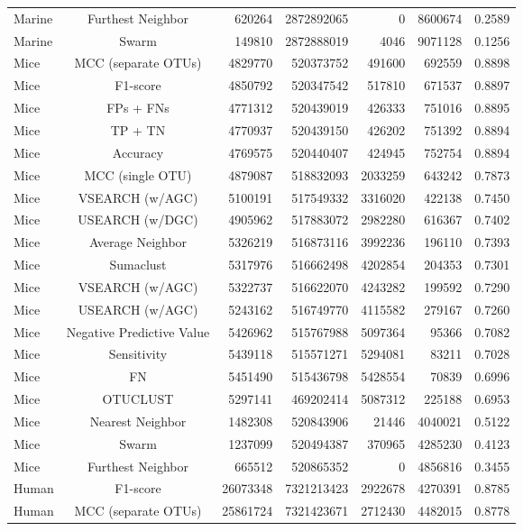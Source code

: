 \documentclass[]{article}
\begin{document}
\begin{table}[!ht]
\begin{tabular}{lcrrrrc}
  Marine & Furthest Neighbor & 620264 & 2872892065 & 0 & 8600674 & 0.2589 \\ 
  Marine & Swarm & 149810 & 2872888019 & 4046 & 9071128 & 0.1256 \\ 
  Mice & MCC (separate OTUs) & 4829770 & 520373752 & 491600 & 692559 & 0.8898 \\ 
  Mice & F1-score & 4850792 & 520347542 & 517810 & 671537 & 0.8897 \\ 
  Mice & FPs + FNs & 4771312 & 520439019 & 426333 & 751016 & 0.8895 \\ 
  Mice & TP + TN & 4770937 & 520439150 & 426202 & 751392 & 0.8894 \\ 
  Mice & Accuracy & 4769575 & 520440407 & 424945 & 752754 & 0.8894 \\ 
  Mice & MCC (single OTU) & 4879087 & 518832093 & 2033259 & 643242 & 0.7873 \\ 
  Mice & VSEARCH (w/AGC) & 5100191 & 517549332 & 3316020 & 422138 & 0.7450 \\ 
  Mice & USEARCH (w/DGC) & 4905962 & 517883072 & 2982280 & 616367 & 0.7402 \\ 
  Mice & Average Neighbor & 5326219 & 516873116 & 3992236 & 196110 & 0.7393 \\ 
  Mice & Sumaclust & 5317976 & 516662498 & 4202854 & 204353 & 0.7301 \\ 
  Mice & VSEARCH (w/AGC) & 5322737 & 516622070 & 4243282 & 199592 & 0.7290 \\ 
  Mice & USEARCH (w/AGC) & 5243162 & 516749770 & 4115582 & 279167 & 0.7260 \\ 
  Mice & Negative Predictive Value & 5426962 & 515767988 & 5097364 & 95366 & 0.7082 \\ 
  Mice & Sensitivity & 5439118 & 515571271 & 5294081 & 83211 & 0.7028 \\ 
  Mice & FN & 5451490 & 515436798 & 5428554 & 70839 & 0.6996 \\ 
  Mice & OTUCLUST & 5297141 & 469202414 & 5087312 & 225188 & 0.6953 \\ 
  Mice & Nearest Neighbor & 1482308 & 520843906 & 21446 & 4040021 & 0.5122 \\ 
  Mice & Swarm & 1237099 & 520494387 & 370965 & 4285230 & 0.4123 \\ 
  Mice & Furthest Neighbor & 665512 & 520865352 & 0 & 4856816 & 0.3455 \\ 
  Human & F1-score & 26073348 & 7321213423 & 2922678 & 4270391 & 0.8785 \\ 
  Human & MCC (separate OTUs) & 25861724 & 7321423671 & 2712430 & 4482015 & 0.8778 \\ 

\end{tabular}
\end{table}
\end{document}
